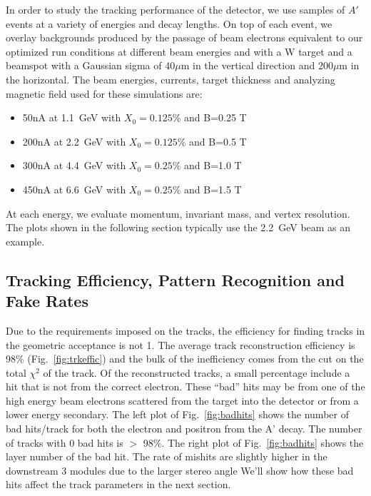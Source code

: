 \label{sec:trkperf}


In order to study the tracking performance of the detector, we use samples of $A'$ events 
at a variety of energies and decay lengths.  On top of each event, we overlay backgrounds 
produced by the passage of  beam electrons equivalent to our optimized run conditions at
different beam energies and with a W target and a beamspot with a Gaussian sigma of 40$\mu$m in the vertical direction and 
200$\mu$m in the horizontal. The beam energies, currents, target thickness and analyzing magnetic field  used for these simulations are:
\begin{itemize}
\item 50nA at 1.1~GeV with $X_0=0.125$\% and  B=0.25 T
\item 200nA at 2.2~GeV with $X_0=0.125$\% and  B=0.5 T
\item 300nA at 4.4~GeV with $X_0=0.25$\% and  B=1.0 T
\item 450nA at 6.6~GeV with $X_0=0.25$\% and  B=1.5 T
\end{itemize}
At each energy, we evaluate momentum, invariant mass, and vertex resolution.  The plots shown in the following section typically use the 2.2~GeV beam as an example.  

\subsection{Tracking Efficiency, Pattern Recognition and Fake Rates}

Due to the requirements imposed on the tracks, the efficiency for finding tracks in the 
geometric acceptance is not 1. The average track reconstruction efficiency is 98\% (Fig.~\ref{fig:trkeffic}) and 
the bulk of the inefficiency comes from the cut on the total $\chi^2$ of the track. 
Of the reconstructed tracks, a small percentage include a hit that is not from 
the correct electron.  These ``bad'' hits may be from one of the high energy beam 
electrons scattered from the target into the detector or from a lower energy secondary.  
The left plot of Fig.~\ref{fig:badhits} shows the number of bad hits/track for both the electron 
and positron from the A' decay.  The number of tracks with 0 bad hits is $>$ 98\%.
The right plot of Fig.~\ref{fig:badhits} shows the layer number of the bad hit.  
The rate of mishits are slightly higher in the downstream 3 modules due to the larger stereo angle %
We'll show how these bad hits affect the track parameters in the next section.



